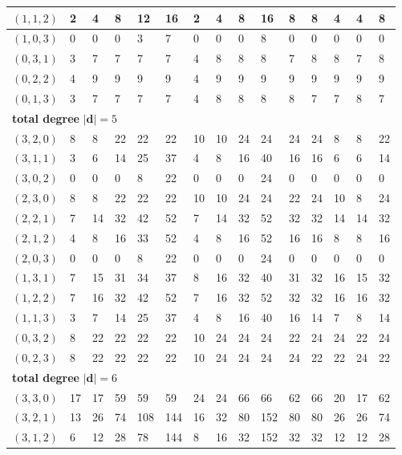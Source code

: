 \documentclass{article}
\newcommand{\bd}{\mathbf{d}}
\begin{document}
\begin{longtable}{|l|l|l|l|l|l|l|l|l|l|l|l|l|l|l|}
$(1,1,2)$ & 2 & 4 & 8 & 12 & 16 & 2 & 4 & 8 & 16 & 8 & 8 & 4 & 4 & 8 \\ \hline
$(1,0,3)$ & 0 & 0 & 0 & 3 & 7 & 0 & 0 & 0 & 8 & 0 & 0 & 0 & 0 & 0 \\ \hline
$(0,3,1)$ & 3 & 7 & 7 & 7 & 7 & 4 & 8 & 8 & 8 & 7 & 8 & 8 & 7 & 8 \\ \hline
$(0,2,2)$ & 4 & 9 & 9 & 9 & 9 & 4 & 9 & 9 & 9 & 9 & 9 & 9 & 9 & 9 \\ \hline
$(0,1,3)$ & 3 & 7 & 7 & 7 & 7 & 4 & 8 & 8 & 8 & 8 & 7 & 7 & 8 & 7 \\ \hline
\multicolumn{15}{|l|}{\textbf{total degree }$|\bd|=5$} \\ \hline
$(3,2,0)$ & 8 & 8 & 22 & 22 & 22 & 10 & 10 & 24 & 24 & 24 & 24 & 8 & 8 & 22 \\ \hline
$(3,1,1)$ & 3 & 6 & 14 & 25 & 37 & 4 & 8 & 16 & 40 & 16 & 16 & 6 & 6 & 14 \\ \hline
$(3,0,2)$ & 0 & 0 & 0 & 8 & 22 & 0 & 0 & 0 & 24 & 0 & 0 & 0 & 0 & 0 \\ \hline
$(2,3,0)$ & 8 & 8 & 22 & 22 & 22 & 10 & 10 & 24 & 24 & 22 & 24 & 10 & 8 & 24 \\ \hline
$(2,2,1)$ & 7 & 14 & 32 & 42 & 52 & 7 & 14 & 32 & 52 & 32 & 32 & 14 & 14 & 32 \\ \hline
$(2,1,2)$ & 4 & 8 & 16 & 33 & 52 & 4 & 8 & 16 & 52 & 16 & 16 & 8 & 8 & 16 \\ \hline
$(2,0,3)$ & 0 & 0 & 0 & 8 & 22 & 0 & 0 & 0 & 24 & 0 & 0 & 0 & 0 & 0 \\ \hline
$(1,3,1)$ & 7 & 15 & 31 & 34 & 37 & 8 & 16 & 32 & 40 & 31 & 32 & 16 & 15 & 32 \\ \hline
$(1,2,2)$ & 7 & 16 & 32 & 42 & 52 & 7 & 16 & 32 & 52 & 32 & 32 & 16 & 16 & 32 \\ \hline
$(1,1,3)$ & 3 & 7 & 14 & 25 & 37 & 4 & 8 & 16 & 40 & 16 & 14 & 7 & 8 & 14 \\ \hline
$(0,3,2)$ & 8 & 22 & 22 & 22 & 22 & 10 & 24 & 24 & 24 & 22 & 24 & 24 & 22 & 24 \\ \hline
$(0,2,3)$ & 8 & 22 & 22 & 22 & 22 & 10 & 24 & 24 & 24 & 24 & 22 & 22 & 24 & 22 \\ \hline
\multicolumn{15}{|l|}{\textbf{total degree }$|\bd|=6$} \\ \hline
$(3,3,0)$ & 17 & 17 & 59 & 59 & 59 & 24 & 24 & 66 & 66 & 62 & 66 & 20 & 17 & 62 \\ \hline
$(3,2,1)$ & 13 & 26 & 74 & 108 & 144 & 16 & 32 & 80 & 152 & 80 & 80 & 26 & 26 & 74 \\ \hline
$(3,1,2)$ & 6 & 12 & 28 & 78 & 144 & 8 & 16 & 32 & 152 & 32 & 32 & 12 & 12 & 28 \\ \hline

\end{longtable}
\end{document}
